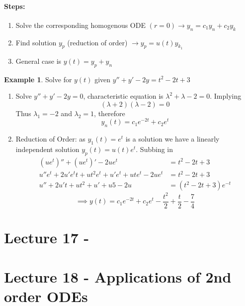 \documentclass{report}
\theoremstyle{definition}
\newtheorem{example}{Example}
\theoremstyle{plain}
\theoremstyle{remark}
\begin{document}
\paragraph{Steps:}
\begin{enumerate}
  \item Solve the corresponding homogenous ODE $ (r=0) \to y_n = c_1 y_n + c_2
    y_k $
  \item Find solution $ y_p $ (reduction of order) $ \to y_p = u(t)y_{k_1} $
  \item General case is $ y(t) = y_p + y_n $
\end{enumerate}
\begin{example}
  Solve for $ y(t) $ given $ y'' + y' - 2y = t^2 - 2t + 3 $
  \begin{enumerate}
    \item Solve $ y'' + y' - 2y = 0 $, characteristic equation is $ \lambda ^2
      + \lambda - 2 = 0$. Implying
      $$ (\lambda+2) (\lambda - 2) = 0 $$
      Thus $ \lambda_1 = -2 $ and $ \lambda _2 = 1 $, therefore
      $$ y_n (t) = c_1 e^{-2t} + c_2 e^t $$
    \item Reduction of Order: as $ y_1(t) = e^t $ is a solution we have
      a linearly independent solution $ y_p(t) = u(t)e^t $. Subbing in 
      \begin{align*}
	(ue^t)'' + (ue^t)' - 2ue^t &= t^2 - 2t + 3\\
	u''e^t + 2u'e^t t + ut^2 e^t + u' e^t + ute^t - 2ue^t &= t^2 - 2t
	+ 3 \\
	u'' + 2u't + ut^2 + u' + u5 - 2u &= (t^2 - 2t + 3)e^{-t}
      \end{align*}
      $$ \implies y(t) = c_1 e^{-2t} + c_2 e^t - \frac{t^2}{2} + \frac{t}{2}
      - \frac{7}{4} $$
  \end{enumerate}
\end{example}

\section{Lecture 17 - }

\section{Lecture 18 - Applications of 2nd order ODEs}
\end{document}
